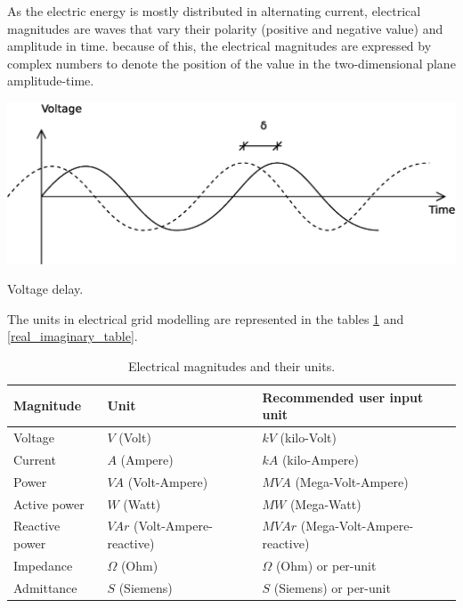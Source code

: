 \documentclass[a4paper,twoside,fleqn]{tufte-book}
\begin{document}
As the electric energy is mostly distributed in alternating current, electrical magnitudes are waves that vary their polarity (positive and negative value) and amplitude in time. because of this, the electrical magnitudes are expressed by complex numbers to denote the position of the value in the two-dimensional plane amplitude-time. 

\begin{marginfigure}
  \includegraphics[width=\linewidth]{img/VoltageDelay.eps}
  \caption{Voltage delay.}
  \label{fig:vdelay}
\end{marginfigure}


The units in electrical grid modelling are represented in the tables \ref{units_table} and \ref{real_imaginary_table}.


\begin{table}[h]
\begin{center}
\footnotesize
\begin{tabular}{lll}
\toprule
Magnitude & Unit & Recommended user input unit\\
\midrule
Voltage & $V$ (Volt) & $kV$ (kilo-Volt)\\
Current & $A$ (Ampere) & $kA$ (kilo-Ampere)\\
Power & $VA$ (Volt-Ampere) & $MVA$ (Mega-Volt-Ampere)\\
Active power & $W$ (Watt) & $MW$ (Mega-Watt)\\
Reactive power & $VAr$ (Volt-Ampere-reactive) & $MVAr$ (Mega-Volt-Ampere-reactive)\\
Impedance & $\Omega$ (Ohm) & $\Omega$ (Ohm) or per-unit\\
Admittance & $S$ (Siemens) &  $S$ (Siemens) or per-unit\\
\bottomrule
\end{tabular}
\end{center}
  \caption{Electrical magnitudes and their units.}
  \label{units_table}
\end{table}
\end{document}
